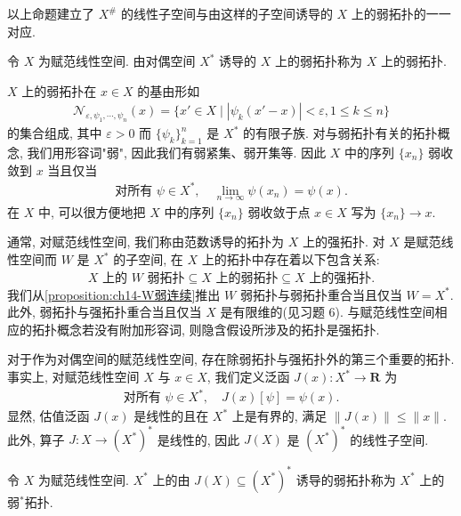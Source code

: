 \documentclass[../../main.tex]{subfiles}
\begin{document}
以上命题建立了 $X^{\#}$ 的线性子空间与由这样的子空间诱导的 $X$ 上的弱拓扑的一一对应.

\begin{definition}[弱拓扑]\label{definition:ch14-弱拓扑}
令 $X$ 为赋范线性空间. 由对偶空间 $X^{*}$ 诱导的 $X$ 上的弱拓扑称为 $X$ 上的弱拓扑.
\end{definition}

$X$ 上的弱拓扑在 $x\in X$ 的基由形如
\begin{align}
\mathcal{N}_{\varepsilon,\psi_{1},\cdots,\psi_{n}}(x)=\{x'\in X\mid|\psi_{k}(x'-x)|<\varepsilon,1\leqslant k\leqslant n\}\label{align:ch14-弱基}
\end{align}
的集合组成, 其中 $\varepsilon>0$ 而 $\{\psi_{k}\}_{k=1}^{n}$ 是 $X^{*}$ 的有限子族. 对与弱拓扑有关的拓扑概念, 我们用形容词"弱", 因此我们有弱紧集、弱开集等. 因此 $X$ 中的序列 $\{x_{n}\}$ 弱收敛到 $x$ 当且仅当
\begin{align}
\text{对所有 }\psi\in X^{*},\quad\lim_{n\to\infty}\psi(x_{n})=\psi(x).\label{align:ch14-弱收敛}
\end{align}
在 $X$ 中, 可以很方便地把 $X$ 中的序列 $\{x_{n}\}$ 弱收敛于点 $x\in X$ 写为 $\{x_{n}\}\to x$.

通常, 对赋范线性空间, 我们称由范数诱导的拓扑为 $X$ 上的强拓扑. 对 $X$ 是赋范线性空间而 $W$ 是 $X^{*}$ 的子空间, 在 $X$ 上的拓扑中存在着以下包含关系:
\begin{align*}
X\text{ 上的 }W\text{ 弱拓扑}\subseteq X\text{ 上的弱拓扑}\subseteq X\text{ 上的强拓扑}.
\end{align*}
我们从\cref{proposition:ch14-W弱连续}推出 $W$ 弱拓扑与弱拓扑重合当且仅当 $W=X^{*}$. 此外, 弱拓扑与强拓扑重合当且仅当 $X$ 是有限维的(见习题 6). 与赋范线性空间相应的拓扑概念若没有附加形容词, 则隐含假设所涉及的拓扑是强拓扑.

对于作为对偶空间的赋范线性空间, 存在除弱拓扑与强拓扑外的第三个重要的拓扑. 事实上, 对赋范线性空间 $X$ 与 $x\in X$, 我们定义泛函 $J(x):X^{*}\to\mathbf{R}$ 为
\begin{align*}
\text{对所有 }\psi\in X^{*},\quad J(x)[\psi]=\psi(x).
\end{align*}
显然, 估值泛函 $J(x)$ 是线性的且在 $X^{*}$ 上是有界的, 满足 $\|J(x)\|\leqslant\|x\|$. 此外, 算子 $J:X\to(X^{*})^{*}$ 是线性的, 因此 $J(X)$ 是 $(X^{*})^{*}$ 的线性子空间.

\begin{definition}[弱$^{*}$拓扑]\label{definition:ch14-弱星拓扑}
令 $X$ 为赋范线性空间. $X^{*}$ 上的由 $J(X)\subseteq(X^{*})^{*}$ 诱导的弱拓扑称为 $X^{*}$ 上的弱$^{*}$拓扑.
\end{definition}
\end{document}
